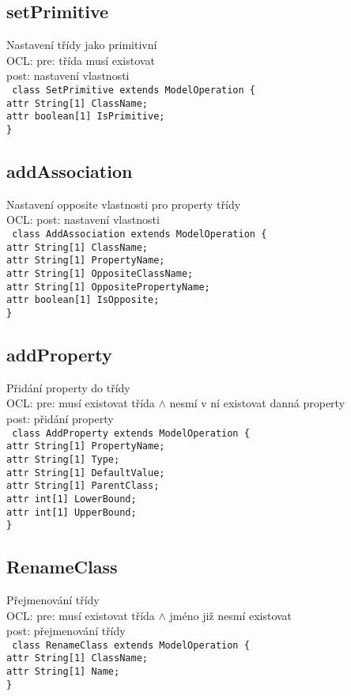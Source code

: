\documentclass[11pt,a4paper]{article}
\begin{document}
	\subsection{setPrimitive}
	Nastavení třídy jako primitivní \\
	OCL: pre: třída musí existovat \\
	post: nastavení vlastnosti \\
	\texttt{
    class SetPrimitive extends ModelOperation \{\\
      attr String[1] ClassName;\\
      attr boolean[1] IsPrimitive;\\
    \}
	}
	\subsection{addAssociation}
	Nastavení opposite vlastnosti pro property třídy \\
	OCL: post: nastavení vlastnosti \\
	\texttt{
    class AddAssociation extends ModelOperation \{\\
      attr String[1] ClassName;\\
      attr String[1] PropertyName;\\
      attr String[1] OppositeClassName;\\
      attr String[1] OppositePropertyName;\\
      attr boolean[1] IsOpposite;\\
    \}
	}
	\subsection{addProperty}
	Přidání property do třídy \\
	OCL: pre: musí existovat třída $\wedge$ nesmí v ní existovat danná property \\	
	post: přidání property \\
	\texttt{
    class AddProperty extends ModelOperation \{\\
      attr String[1] PropertyName;\\
      attr String[1] Type;\\
      attr String[1] DefaultValue;\\
      attr String[1] ParentClass;\\
      attr int[1] LowerBound;\\
      attr int[1] UpperBound;\\
    \}
	}	
	\subsection{RenameClass}
	Přejmenování třídy \\
	OCL: pre: musí existovat třída	$\wedge$ jméno již nesmí existovat \\
	post: přejmenování třídy \\
	\texttt{
     class RenameClass extends ModelOperation \{ \\
      attr String[1] ClassName;\\
      attr String[1] Name;\\
    \}
	}
\end{document}
